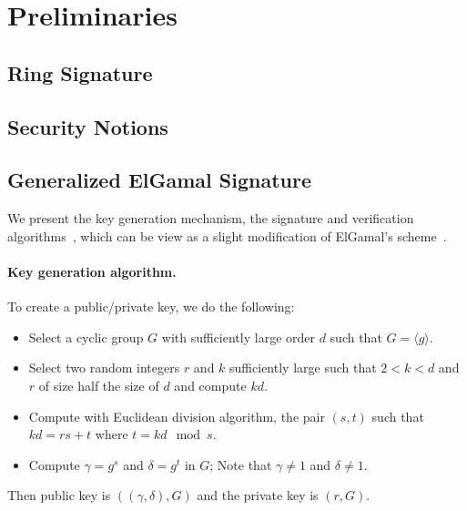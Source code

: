 \documentclass[a4paper,11pt]{article}
\begin{document}
\section{Preliminaries}\label{sec:two}

\subsection{Ring Signature}\label{sec:two:1}

\subsection{Security Notions}\label{sec:two:2}

\subsection{Generalized ElGamal Signature}\label{sec:two:2}
We present the key generation mechanism, the signature and verification
algorithms~\cite{sow}, which can be view as a slight modification of
ElGamal's scheme~\cite{Elgamal}.

\paragraph{Key generation algorithm.}
    To create a public/private key, we do the following:
\begin{itemize}
    \item Select a cyclic group $G$ with sufficiently large order $d$ such that $G=\langle g \rangle$.

    \item Select two random integers $r$ and $k$ sufficiently large
      such that $ 2 < k < d$ and $r$ of size half the size of $d$ and compute $kd$.
    \item Compute with Euclidean division algorithm, the pair $(s,t)$
      such that $kd= rs+t$ where $t = kd \mod s$.

    \item  Compute $\gamma = g^{s} $ and $\delta = g^{t} $ in $G$; Note that $\gamma \neq 1$ and $\delta \neq 1$.
\end{itemize}
Then public key is $((\gamma, \delta), G)$ and the private key is $( r, G)$.
\end{document}
